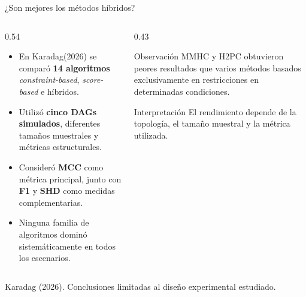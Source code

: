 \documentclass[aspectratio=169,11pt]{beamer}
\begin{document}
\begin{frame}[t]{¿Son mejores los métodos híbridos?}
  \begin{columns}[T,onlytextwidth]

    \begin{column}{0.54\textwidth}
      \begin{itemize}
        \item En Karadag(2026) se comparó
        \textbf{14 algoritmos} \textit{constraint-based},
        \textit{score-based} e híbridos.

        \item Utilizó \textbf{cinco DAGs simulados},
        diferentes tamaños muestrales y
        métricas estructurales.

        \item Consideró \textbf{MCC} como métrica principal,
        junto con \textbf{F1} y \textbf{SHD}
        como medidas complementarias.

        \item Ninguna familia de algoritmos
        \alert{dominó sistemáticamente}
        en todos los escenarios.
      \end{itemize}
    \end{column}

    \begin{column}{0.43\textwidth}
      \begin{block}{Observación}
        MMHC y H2PC obtuvieron peores resultados
        que varios métodos basados exclusivamente
        en restricciones en determinadas condiciones.
      \end{block}

      \begin{alertblock}{Interpretación}
        El rendimiento depende de la topología,
        el tamaño muestral y la métrica utilizada.
      \end{alertblock}
    \end{column}

  \end{columns}

  \vfill

  {\scriptsize\color{upmgray}
    Karadag (2026). Conclusiones limitadas
    al diseño experimental estudiado.
  }

  \vspace{0.1cm}
\end{frame}
\end{document}
